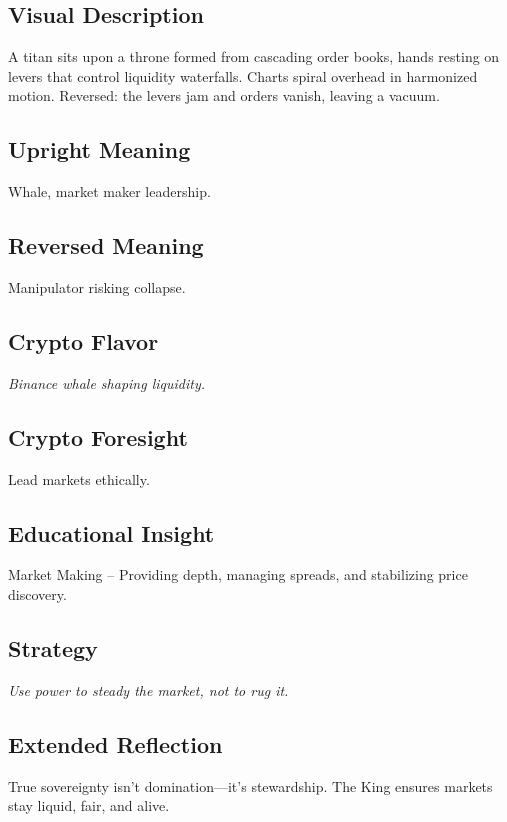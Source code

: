\documentclass[11pt,oneside]{book}
\begin{document}
\begin{minipage}[t]{0.55\textwidth}
  \vspace{0pt}

  \subsection*{Visual Description}
  A titan sits upon a throne formed from cascading order books, hands resting on levers that control liquidity waterfalls. Charts spiral overhead in harmonized motion. Reversed: the levers jam and orders vanish, leaving a vacuum.

  \subsection*{Upright Meaning}
  Whale, market maker leadership.

  \subsection*{Reversed Meaning}
  Manipulator risking collapse.

  \subsection*{Crypto Flavor}
  \textit{Binance whale shaping liquidity.}

  \subsection*{Crypto Foresight}
  Lead markets ethically.

  \subsection*{Educational Insight}
  Market Making – Providing depth, managing spreads, and stabilizing price discovery.

  \subsection*{Strategy}
  \textit{Use power to steady the market, not to rug it.}

  \subsection*{Extended Reflection}
  True sovereignty isn't domination—it's stewardship. The King ensures markets stay liquid, fair, and alive.


\end{minipage}
\end{document}
